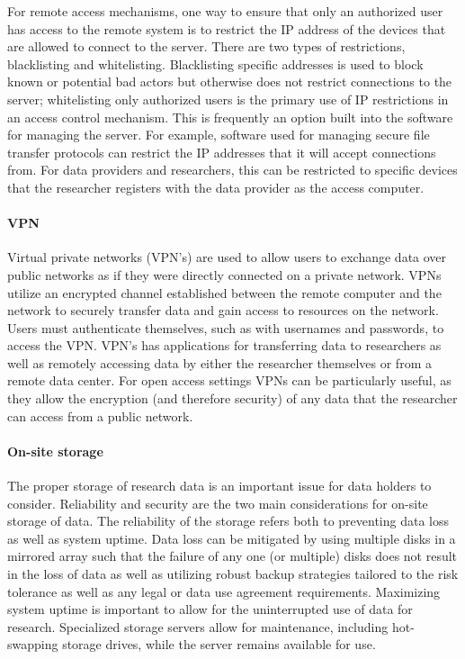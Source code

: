 For remote access mechanisms, one way to ensure that only an authorized
user has access to the remote system is to restrict the
\textbar{}\textbar{}IP\textbar{}\textbar{} address of the devices that
are allowed to connect to the server. There are two types of
restrictions, blacklisting and whitelisting. Blacklisting specific
addresses is used to block known or potential bad actors but otherwise
does not restrict connections to the server; whitelisting only
authorized users is the primary use of IP restrictions in an access
control mechanism. This is frequently an option built into the software
for managing the server. For example, software used for managing secure
file transfer protocols can restrict the IP addresses that it will
accept connections from. For data providers and researchers, this can be
restricted to specific devices that the researcher registers with the
data provider as the access computer.

\hypertarget{vpn}{%
\paragraph{VPN}\label{vpn}}

Virtual private networks (VPN's) are used to allow users to exchange
data over public networks as if they were directly connected on a
private network. VPNs utilize an encrypted channel established between
the remote computer and the network to securely transfer data and gain
access to resources on the network. Users must authenticate themselves,
such as with usernames and passwords, to access the VPN. VPN's has
applications for transferring data to researchers as well as remotely
accessing data by either the researcher themselves or from a remote data
center. For open access settings VPNs can be particularly useful, as
they allow the encryption (and therefore security) of any data that the
researcher can access from a public network.

\hypertarget{on-site-storage}{%
\paragraph{On-site storage}\label{on-site-storage}}

The proper storage of research data is an important issue for data
holders to consider. Reliability and security are the two main
considerations for on-site storage of data. The reliability of the
storage refers both to preventing data loss as well as system uptime.
Data loss can be mitigated by using multiple disks in a mirrored array
such that the failure of any one (or multiple) disks does not result in
the loss of data as well as utilizing robust backup strategies tailored
to the risk tolerance as well as any legal or data use agreement
requirements. Maximizing system uptime is important to allow for the
uninterrupted use of data for research. Specialized storage servers
allow for maintenance, including hot-swapping storage drives, while the
server remains available for use.

